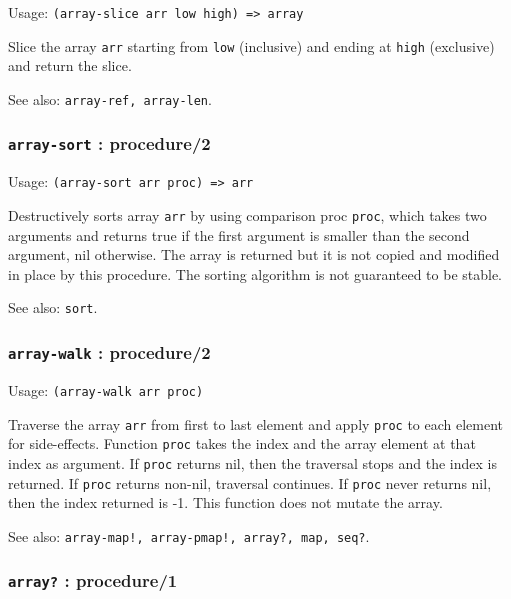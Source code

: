 \documentclass[
]{article}
\newcommand{\passthrough}[1]{#1}
\begin{document}
Usage: \passthrough{\lstinline!(array-slice arr low high) => array!}

Slice the array \passthrough{\lstinline!arr!} starting from
\passthrough{\lstinline!low!} (inclusive) and ending at
\passthrough{\lstinline!high!} (exclusive) and return the slice.

See also: \passthrough{\lstinline!array-ref, array-len!}.

\hypertarget{array-sort-procedure2}{%
\subsubsection{\texorpdfstring{\texttt{array-sort} :
procedure/2}{array-sort : procedure/2}}\label{array-sort-procedure2}}

Usage: \passthrough{\lstinline!(array-sort arr proc) => arr!}

Destructively sorts array \passthrough{\lstinline!arr!} by using
comparison proc \passthrough{\lstinline!proc!}, which takes two
arguments and returns true if the first argument is smaller than the
second argument, nil otherwise. The array is returned but it is not
copied and modified in place by this procedure. The sorting algorithm is
not guaranteed to be stable.

See also: \passthrough{\lstinline!sort!}.

\hypertarget{array-walk-procedure2}{%
\subsubsection{\texorpdfstring{\texttt{array-walk} :
procedure/2}{array-walk : procedure/2}}\label{array-walk-procedure2}}

Usage: \passthrough{\lstinline!(array-walk arr proc)!}

Traverse the array \passthrough{\lstinline!arr!} from first to last
element and apply \passthrough{\lstinline!proc!} to each element for
side-effects. Function \passthrough{\lstinline!proc!} takes the index
and the array element at that index as argument. If
\passthrough{\lstinline!proc!} returns nil, then the traversal stops and
the index is returned. If \passthrough{\lstinline!proc!} returns
non-nil, traversal continues. If \passthrough{\lstinline!proc!} never
returns nil, then the index returned is -1. This function does not
mutate the array.

See also:
\passthrough{\lstinline"array-map!, array-pmap!, array?, map, seq?"}.

\hypertarget{array-procedure1}{%
\subsubsection{\texorpdfstring{\texttt{array?} :
procedure/1}{array? : procedure/1}}\label{array-procedure1}}
\end{document}
